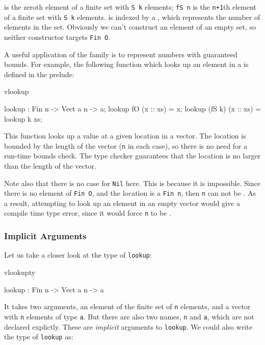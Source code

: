  is the zeroth element of a finite set with \texttt{S k} elements; 
\texttt{fS n} is the
\texttt{n+1}th element of a finite set with \texttt{S k} elements. 
 is indexed by a , which
represents the number of elements in the set. Obviously we can't construct an
element of an empty set, so neither constructor targets \texttt{Fin O}.

A useful application of the  family is to represent numbers with
guaranteed bounds. For example, the following function which looks up an element in a 
is defined in the prelude:

\begin{SaveVerbatim}{vlookup}

lookup : Fin n -> Vect a n -> a;
lookup fO     (x :: xs) = x;
lookup (fS k) (x :: xs) = lookup k xs;

\end{SaveVerbatim}

This function looks up a value at a given location in a vector. The location is
bounded by the length of the vector (\texttt{n} in each case), so there is no
need for a run-time bounds check. The type checker guarantees that the location
is no larger than the length of the vector.

Note also that there is no case for \texttt{Nil} here. This is because it is
impossible. Since there is no element of \texttt{Fin O}, and the location is a
\texttt{Fin n}, then \texttt{n} can not be .  As a result, attempting to
look up an element in an empty vector would give a compile time type error,
since it would force \texttt{n} to be .

\subsubsection{Implicit Arguments}

Let us take a closer look at the type of \texttt{lookup}:

\begin{SaveVerbatim}{vlookupty}

lookup : Fin n -> Vect a n -> a

\end{SaveVerbatim}

\noindent
It takes two arguments, an element of the finite set of \texttt{n} elements, and a vector
with \texttt{n} elements of type \texttt{a}. But there are also two names, 
\texttt{n} and \texttt{a}, which are not declared explictly. These are \emph{implicit}
arguments to \texttt{lookup}. We could also write the type of \texttt{lookup} as:

